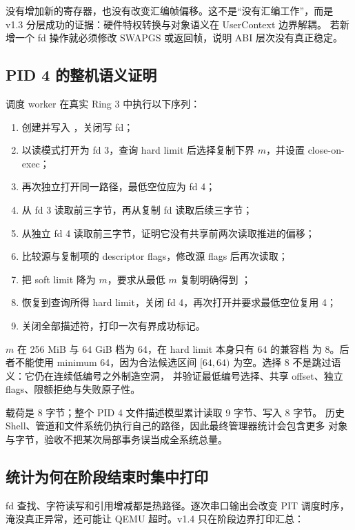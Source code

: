 没有增加新的寄存器，也没有改变汇编帧偏移。这不是“没有汇编工作”，而是
v1.3 分层成功的证据：硬件特权转换与对象语义在 UserContext 边界解耦。
若新增一个 fd 操作就必须修改 SWAPGS 或返回帧，说明 ABI 层次没有真正稳定。

\subsection{PID 4 的整机语义证明}

调度 worker 在真实 Ring 3 中执行以下序列：

\begin{enumerate}
  \item 创建并写入 ，关闭写 fd；
  \item 以读模式打开为 fd 3，查询 hard limit 后选择复制下界 \(m\)，并设置
        close-on-exec；
  \item 再次独立打开同一路径，最低空位应为 fd 4；
  \item 从 fd 3 读取前三字节，再从复制 fd 读取后续三字节；
  \item 从独立 fd 4 读取前三字节，证明它没有共享前两次读取推进的偏移；
  \item 比较源与复制项的 descriptor flags，修改源 flags 后再次读取；
  \item 把 soft limit 降为 \(m\)，要求从最低 \(m\) 复制明确得到 ；
  \item 恢复到查询所得 hard limit，关闭 fd 4，再次打开并要求最低空位复用 4；
  \item 关闭全部描述符，打印一次有界成功标记。
\end{enumerate}

\(m\) 在 256 MiB 与 64 GiB 档为 64，在 hard limit 本身只有 64 的兼容档
为 8。后者不能使用 minimum 64，因为合法候选区间
\([64,64)\) 为空。选择 8 不是跳过语义：它仍在连续低编号之外制造空洞，
并验证最低编号选择、共享 offset、独立 flags、限额拒绝与失败原子性。

载荷是 8 字节；整个 PID 4 文件描述模型累计读取 9 字节、写入 8 字节。
历史 Shell、管道和文件系统仍执行自己的路径，因此最终管理器统计会包含更多
对象与字节，验收不把某次局部事务误当成全系统总量。

\subsection{统计为何在阶段结束时集中打印}

fd 查找、字符读写和引用增减都是热路径。逐次串口输出会改变 PIT 调度时序，
淹没真正异常，还可能让 QEMU 超时。v1.4 只在阶段边界打印汇总：

